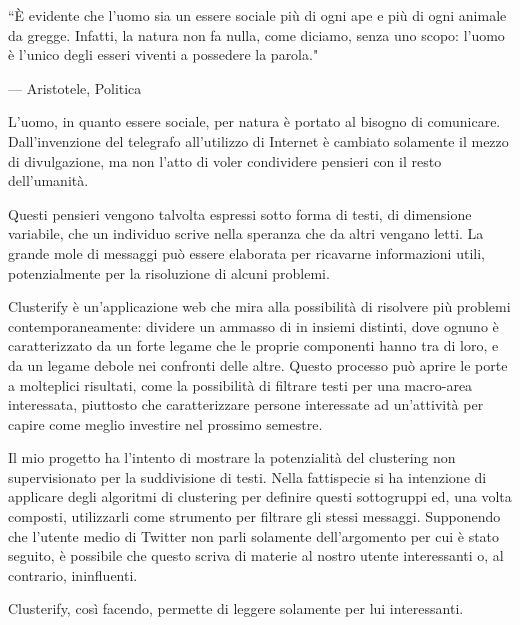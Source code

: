 
\epigraph{``È evidente che l’uomo sia un essere sociale più di ogni ape e più di ogni animale da gregge. Infatti, la natura non fa nulla, come diciamo, senza uno scopo: l’uomo è l’unico degli esseri viventi a possedere la parola."}{--- \textup{Aristotele}, Politica }

L'uomo, in quanto essere sociale, per natura è portato al bisogno di comunicare. Dall'invenzione del telegrafo all'utilizzo di Internet è cambiato solamente il mezzo di divulgazione, ma non l'atto di voler condividere pensieri con il resto dell'umanità.

Questi pensieri vengono talvolta espressi sotto forma di testi, di dimensione variabile, che un individuo scrive nella speranza che da altri vengano letti. La grande mole di messaggi può essere elaborata per ricavarne informazioni utili, potenzialmente per la risoluzione di alcuni problemi.

Clusterify è un'applicazione web che mira alla possibilità di risolvere più problemi contemporaneamente: dividere un ammasso di  in insiemi distinti, dove ognuno è caratterizzato da un forte legame che le proprie componenti hanno tra di loro, e da un legame debole nei confronti delle altre. Questo processo può aprire le porte a molteplici risultati, come la possibilità di filtrare testi per una macro-area interessata, piuttosto che caratterizzare persone interessate ad un'attività per capire come meglio investire nel prossimo semestre.

Il mio progetto ha l'intento di mostrare la potenzialità del clustering non supervisionato per la suddivisione di testi. Nella fattispecie si ha intenzione di applicare degli algoritmi di clustering per definire questi sottogruppi ed, una volta composti, utilizzarli come strumento per filtrare gli stessi messaggi. Supponendo che l'utente medio di Twitter non parli solamente dell'argomento per cui è stato seguito, è possibile che questo scriva di materie al nostro utente interessanti o, al contrario, ininfluenti. 

Clusterify, così facendo, permette di leggere solamente  per lui interessanti. 